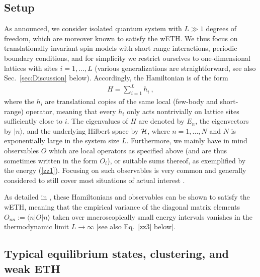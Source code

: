 \documentclass[twocolumn,aps,prb,floatfix,superscriptaddress]{revtex4-2}
\newcommand{\ket}[1]{\lvert #1 \rangle} 	%
\newcommand{\bra}[1]{\langle #1 \rvert}	%
\newcommand{\<}{\left\langle}	%
\renewcommand{\>}{\right\rangle}	%
\newcommand{\hr}{{\cal H}}
\begin{document}
\subsection{Setup}
\label{sec:Preliminaries:Setup}

As announced, 
we consider isolated quantum system with 
$L\gg 1$ degrees of freedom, which are 
moreover known to satisfy the wETH.
We thus focus on translationally invariant 
spin models
with short range interactions,
periodic boundary conditions, 
and for simplicity we restrict ourselves 
to one-dimensional lattices with 
sites $i= 1,...,L$
(various generalizations are straightforward,
see also
Sec.~\ref{sec:Discussion} below).
Accordingly, the Hamiltonian is of the form 
\begin{eqnarray}
H=\sum_{i=1}^L h_i \ ,
\label{zz1}
\end{eqnarray}
where the 
$h_i$ are translational copies of 
the same 
local (few-body and short-range) 
operator, meaning that every $h_i$
only acts nontrivially on lattice sites 
sufficiently close to $i$.
The eigenvalues of $H$ are denoted by $E_n$,
the eigenvectors by $|n\rangle$,
and the underlying Hilbert space by $\hr$, where
$n=1,...,N$ and $N$ is exponentially 
large in the system size $L$.
Furthermore, we 
mainly have in mind observables $O$
which are local operators as specified above
(and are thus sometimes written in the form $O_i$), 
or suitable sums thereof,
as exemplified by the energy (\ref{zz1}).
Focusing on such observables is very common and generally 
considered to still cover most situations of actual interest 
\cite{tas16,ued20,dal16,gog16,mor18}.

As detailed in \cite{bir10,mor16,iyo17,mor18,kuw20,kuw20a},
these Hamiltonians and observables can be shown to satisfy the wETH,
meaning that the empirical variance of the diagonal 
matrix elements $O_{nn}:=\bra{n} O \ket{n}$ taken over macroscopically 
small energy intervals vanishes in the thermodynamic limit
$L\to\infty$ 
[see also Eq.~\eqref{zz3} below].

\subsection{Typical equilibrium states, clustering, and weak ETH}
\label{sec:Preliminaries:TypClustWETH}
\end{document}
